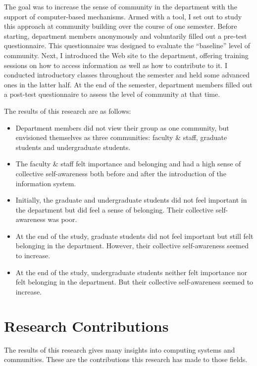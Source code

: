 The goal was to increase the sense of community in the department with the
support of computer-based mechanisms.  Armed with a tool, I set out to study
this approach at community building over the course of one semester.  Before
starting, department members anonymously and voluntarily filled out a pre-test
questionnaire.  This questionnaire was designed to evaluate the ``baseline''
level of community.  Next, I introduced the Web site to the department,
offering training sessions on how to access information as well as how to
contribute to it.  I conducted introductory classes throughout the semester and
held some advanced ones in the latter half.  At the end of the semester,
department members filled out a post-test questionnaire to assess the level of
community at that time.

The results of this research are as follows:

\begin{itemize}
\item{Department members did not view their group as one community, but
  envisioned themselves as three communities: faculty \& staff, graduate
  students and undergraduate students.}
\item{The faculty \& staff felt importance and belonging and had a high sense of
  collective self-awareness both before and after the introduction of the
  information system.}
\item{Initially, the graduate and undergraduate students did not feel important
  in the department but did feel a sense of belonging.  Their collective
  self-awareness was poor.}
\item{At the end of the study, graduate students did not feel important but
  still felt belonging in the department.  However, their collective
  self-awareness seemed to increase.}
\item{At the end of the study, undergraduate students neither felt importance
  nor felt belonging in the department.  But their collective self-awareness
  seemed to increase.}
\end{itemize}

\section{Research Contributions}
The results of this research gives many insights into computing systems and
communities.  These are the contributions this research has made to those
fields.

